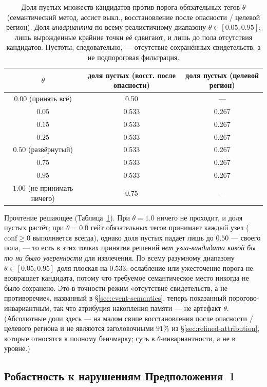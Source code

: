 \documentclass{article}
\begin{document}
\begin{table}[h]
\caption{Доля пустых множеств кандидатов против порога обязательных тегов $\theta$ (семантический метод, ассист выкл., восстановление после опасности / целевой регион). Доля \emph{инвариантна} по всему реалистичному диапазону $\theta\in[0.05,0.95]$; лишь вырожденные крайние точки её сдвигают, и лишь до пола отсутствия кандидатов. Пустоты, следовательно, --- отсутствие сохранённых свидетельств, а не подпороговая фильтрация.}
\label{tab:theta-robustness}
\centering
\small
\begin{tabular}{c c c}
\toprule
$\theta$ & доля пустых (восст. после опасности) & доля пустых (целевой регион) \\
\midrule
$0.00$ (принять всё) & 0.50 & --- \\
$0.05$ & 0.533 & 0.267 \\
$0.15$ & 0.533 & 0.267 \\
$0.25$ & 0.533 & 0.267 \\
$0.50$ (развёрнутый) & 0.533 & 0.267 \\
$0.75$ & 0.533 & 0.267 \\
$0.95$ & 0.533 & 0.267 \\
$1.00$ (не принимать ничего) & 0.75 & --- \\
\bottomrule
\end{tabular}
\end{table}

Прочтение решающее (Таблица~\ref{tab:theta-robustness}). При $\theta{=}1.0$ ничего не проходит, и доля пустых растёт; при $\theta{=}0.0$ гейт обязательных тегов принимает каждый узел ($\mathrm{conf}\ge 0$ выполняется всегда), однако доля пустых падает лишь до $0.50$ --- своего пола, --- то есть в этих точках принятия решений \emph{нет узла-кандидата какой бы то ни было уверенности} для извлечения. По всему разумному диапазону $\theta\in[0.05,0.95]$ доля плоская на $0.533$: ослабление или ужесточение порога не возвращает кандидата, потому что требуемое семантическое место никогда не было сохранено. Это в точности режим «отсутствие свидетельств, а не противоречие», названный в \S\ref{sec:event-semantics}, теперь показанный порогово-инвариантным, так что атрибуция накопления памяти --- не артефакт $\theta$. (Абсолютные доли здесь --- на малом свипе восстановления после опасности / целевого региона и не являются заголовочными $91\%$ из \S\ref{sec:refined-attribution}, которые относятся к полному бенчмарку; суть в $\theta$-инвариантности, а не в уровне.)

\subsection{Робастность к нарушениям Предположения~1}
\label{app:assumption1-stress}
\end{document}
